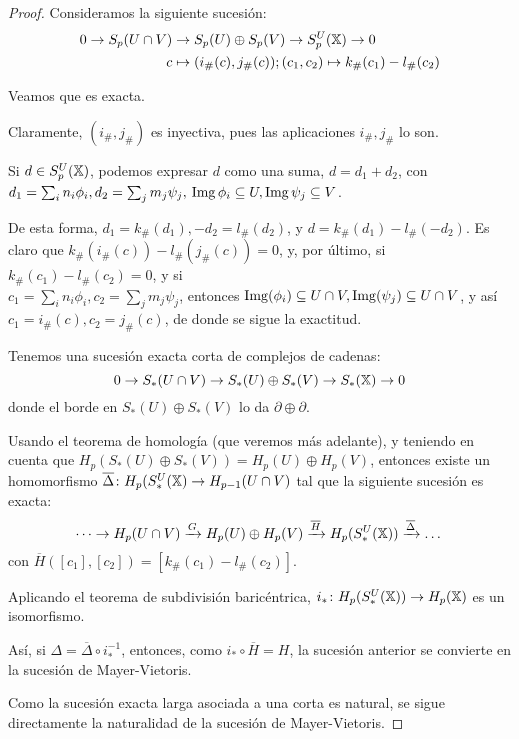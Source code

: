 \begin{proof}
  Consideramos la siguiente sucesión:
  \begin{align*}
    0 \to S_p(U \cap V) &\to S_p(U) \oplus S_p(V) \to S_p^U({\mathbb X}) \to 0 \\
                    c &\mapsto (i_\#(c), j_\#(c)); (c_1, c_2) \mapsto k_\#(c_1) - l_\#(c_2)
  \end{align*}

  Veamos que es exacta.

  Claramente, $(i_\#, j_\#)$ es inyectiva, pues las aplicaciones $i_\#, j_\#$ lo son.

  Si $d \in S_p^U({\mathbb X})$, podemos expresar $d$ como una suma, $d = d_1 + d_2$, con \\
  $d_1 = \sum_i n_i \phi_i, d_2 = \sum_j m_j \psi_j, \hspace{0.2em}  \operatorname{Img} \phi_i \subseteq U, \operatorname{Img} \psi_j \subseteq V$.

  De esta forma, $d_1 = k_\#(d_1), -d_2 = l_\#(d_2)$, y $d = k_\#(d_1) - l_\#(-d_2)$.
  Es claro que $k_\#(i_\#(c)) - l_\#(j_\#(c)) = 0$, y, por último, si $k_\#(c_1) - l_\#(c_2) = 0$, y si \\
  $c_1 = \sum_i n_i \phi_i,  c_2 = \sum_j m_j \psi_j$, entonces $\operatorname{Img}(\phi_i) \subseteq U \cap V, \operatorname{Img}(\psi_j) \subseteq U \cap V$,
  y así $c_1 = i_\#(c), c_2 = j_\#(c)$, de donde se sigue la exactitud.

  Tenemos una sucesión exacta corta de complejos de cadenas:
  \[ 0 \to S_*(U \cap V) \to S_*(U) \oplus S_*(V) \to S_*({\mathbb X}) \to 0 \]
  donde el borde en $S_*(U) \oplus S_*(V)$ lo da $\partial \oplus \partial$.

  Usando el teorema de homología (que veremos más adelante), y teniendo en cuenta que $H_p(S_*(U) \oplus S_*(V)) = H_p(U) \oplus H_p(V)$,
  entonces existe un homomorfismo $\overline{\Delta} \colon H_p(S_*^U({\mathbb X}) \to H_{p-1}(U \cap V)$ tal que la siguiente sucesión es exacta:
  \[ \dots \to H_p(U \cap V) \xrightarrow{G} H_p(U) \oplus H_p(V) \xrightarrow{\overline{H}} H_p(S_*^U({\mathbb X})) \xrightarrow{\overline{\Delta}} \dots \]
  con $\overline{H}([c_1], [c_2]) = [k_\#(c_1) - l_\#(c_2)]$.

  Aplicando el teorema de subdivisión baricéntrica, $i_* \colon H_p(S_*^U({\mathbb X})) \to H_p({\mathbb X})$ es un isomorfismo.

  Así, si $\Delta = \overline{\Delta} \circ i_*^{-1}$, entonces, como $i_* \circ \overline{H} = H$, la sucesión anterior se convierte
  en la sucesión de Mayer-Vietoris.

  Como la sucesión exacta larga asociada a una corta es natural, se sigue directamente la naturalidad de la sucesión de Mayer-Vietoris.
\end{proof}

